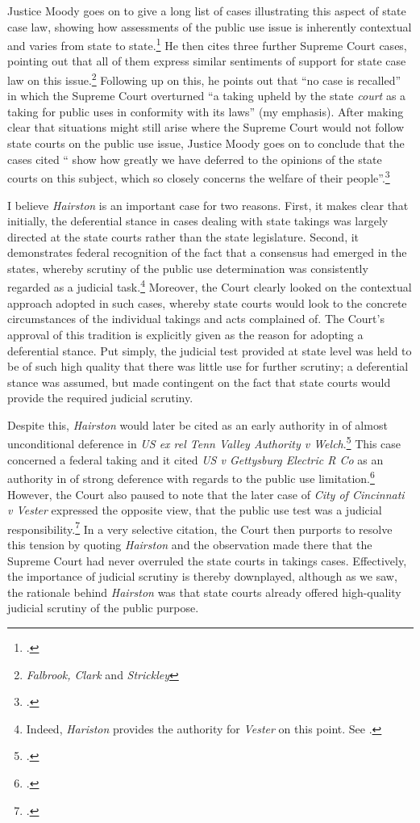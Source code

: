 Justice Moody goes on to give a long list of cases illustrating this aspect of state case law, showing how assessments of the public use issue is inherently contextual and varies from state to state.\footcite[607]{hairston08} He then cites three further Supreme Court cases, pointing out that all of them express similar sentiments of support for state case law on this issue.\footnote{{\it Falbrook, Clark} and {\it Strickley}} Following up on this, he points out that ``no case is recalled'' in which the Supreme Court overturned ``a taking upheld by the state {\it court} as a taking for public uses in conformity with its laws'' (my emphasis). After making clear that situations might still arise where the Supreme Court would not follow state courts on the public use issue, Justice Moody goes on to conclude that the cases cited `` show how greatly we have deferred to the opinions of the state courts on this subject, which so closely concerns the welfare of their people''.\footcite[606]{hairston08}

I believe {\it Hairston} is an important case for two reasons. First, it makes clear that initially, the deferential stance in cases dealing with state takings was largely directed at the state courts rather than the state legislature. Second, it demonstrates federal recognition of the fact that a consensus had emerged in the states, whereby scrutiny of the public use determination was consistently regarded as a judicial task.\footnote{Indeed, {\it Hariston} provides the authority for {\it Vester} on this point. See \cite[606]{vester30}.} Moreover, the Court clearly looked  on the contextual approach adopted in such cases, whereby state courts would look to the concrete circumstances of the individual takings and acts complained of. The Court's approval of this tradition is explicitly given as the reason for adopting a deferential stance. Put simply, the judicial test provided at state level was held to be of such high quality that there was little use for further scrutiny; a deferential stance was assumed, but made contingent on the fact that state courts would provide the required judicial scrutiny.

Despite this, {\it Hairston} would later be cited as an early authority in  of almost unconditional deference in {\it US ex rel Tenn Valley Authority v Welch}.\footcite[552]{welch46} This case concerned a federal taking and it cited {\it US v Gettysburg Electric R Co} as an authority in  of strong deference with regards to the public use limitation.\footcite{gettysburg96} However, the Court also paused to note that the later case of {\it City of Cincinnati v Vester} expressed the opposite view, that the public use test was a judicial responsibility.\footcite{vester30} In a very selective citation, the Court then purports to resolve this tension by quoting {\it Hairston} and the observation made there that the Supreme Court had never overruled the state courts in takings cases. Effectively, the importance of judicial scrutiny is thereby downplayed, although as we saw, the rationale behind {\it Hairston} was that state courts already offered high-quality judicial scrutiny of the public purpose.


